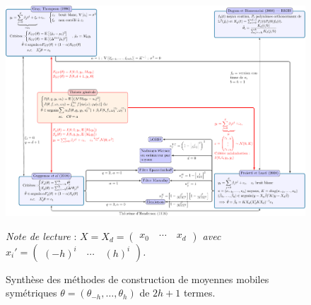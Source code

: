 \documentclass[
  11pt,
  french,
  a4paper]{article}
\newcommand\1{\mathds{1}}
\begin{document}
\begin{figure}

{\centering \includegraphics[width=0.9\textheight,angle=90]{img/bookdown/pdf/diag-gen-sym-1} 

}

\caption[Synthèse des méthodes de construction de moyennes mobiles symétriques \(\theta=(\theta_{-h},\dots,\theta_{h})\) de \(2h+1\) termes]{Synthèse des méthodes de construction de moyennes mobiles symétriques \(\theta=(\theta_{-h},\dots,\theta_{h})\) de \(2h+1\) termes.}\label{fig:diag-gen-sym}

\footnotesize


\emph{Note de lecture} : \emph{\(X = X_d = \begin{pmatrix} x_0 \quad\cdots \quad x_d \end{pmatrix}\) avec \(x_i'=\begin{pmatrix} (-h)^i \quad \cdots \quad (h)^i\end{pmatrix}\).}
\normalsize\end{figure}
\end{document}
